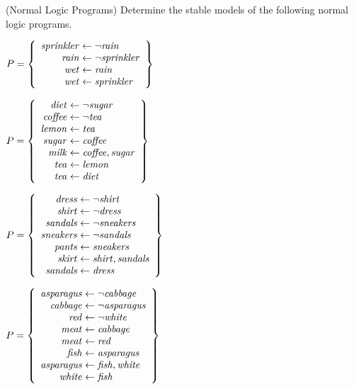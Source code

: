 \begin{Uebung}{(Normal Logic Programs)}
Determine the stable models of the following normal logic programs.
\begin{UList}
\item
\(
P =
\left\{
\begin{array}{r@{{}\leftarrow{}}l}
\mathit{sprinkler} & \naf{\mathit{rain}}
\\
\mathit{rain}      & \naf{\mathit{sprinkler}}
\\
\mathit{wet}       & \mathit{rain}
\\
\mathit{wet}       & \mathit{sprinkler}
\end{array}
\right\}
\)
\item
\(
P =
\left\{
\begin{array}{r@{{}\leftarrow{}}l}
\mathit{diet}   & \naf{\mathit{sugar}}
\\
\mathit{coffee} & \naf{\mathit{tea}}
\\
\mathit{lemon}  & \mathit{tea}
\\
\mathit{sugar}  & \mathit{coffee}
\\
\mathit{milk}   & \mathit{coffee}, \mathit{sugar}
\\
\mathit{tea}    & \mathit{lemon}
\\
\mathit{tea}    & \mathit{diet}
\end{array}
\right\}
\)
\item
\(
P =
\left\{
\begin{array}{r@{{}\leftarrow{}}l}
\mathit{dress}    & \naf{\mathit{shirt}}
\\
\mathit{shirt}    & \naf{\mathit{dress}}
\\
\mathit{sandals}  & \naf{\mathit{sneakers}}
\\
\mathit{sneakers} & \naf{\mathit{sandals}}
\\
\mathit{pants}    & \mathit{sneakers}
\\
\mathit{skirt}    & \mathit{shirt}, \mathit{sandals}
\\
\mathit{sandals}  & \mathit{dress}
\end{array}
\right\}
\)
\item
\(
P =
\left\{
\begin{array}{r@{{}\leftarrow{}}l}
\mathit{asparagus} & \naf{\mathit{cabbage}}
\\
\mathit{cabbage}   & \naf{\mathit{asparagus}}
\\
\mathit{red}       & \naf{\mathit{white}}
\\
\mathit{meat}      & \mathit{cabbage}
\\
\mathit{meat}      & \mathit{red}
\\
\mathit{fish}      & \mathit{asparagus}
\\
\mathit{asparagus} & \mathit{fish}, \mathit{white}
\\
\mathit{white}     & \mathit{fish} %
\end{array}
\right\}
\)
\end{UList}
\end{Uebung}

